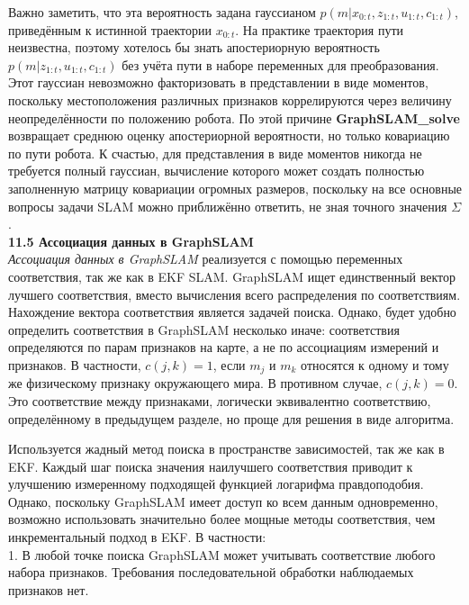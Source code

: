 \documentclass[10pt,a4paper]{article}
\begin{document}
Важно заметить, что эта вероятность задана гауссианом $p(m|x_{0:t},z_{1:t},u_{1:t},c_{1:t})$, приведённым к истинной траектории $x_{0:t}$. На практике траектория пути неизвестна, поэтому хотелось бы знать апостериорную вероятность  $p(m|z_{1:t},u_{1:t},c_{1:t})$ без учёта пути в наборе переменных для преобразования.  Этот гауссиан невозможно факторизовать в представлении в виде моментов, поскольку местоположения различных признаков коррелируются через величину неопределённости по положению робота. По этой причине \textbf{GraphSLAM\_solve} возвращает среднюю оценку апостериорной вероятности, но только ковариацию по пути робота. К счастью, для представления в виде моментов никогда не требуется полный гауссиан, вычисление которого может создать полностью заполненную матрицу ковариации огромных размеров, поскольку на все основные вопросы задачи SLAM можно приближённо ответить, не зная точного значения $\varSigma$.\\

\textbf{11.5	Ассоциация данных в GraphSLAM}\\

\textit{Ассоциация данных в GraphSLAM} реализуется с помощью переменных соответствия, так же как в EKF SLAM. GraphSLAM ищет единственный вектор лучшего соответствия, вместо вычисления всего распределения по соответствиям. Нахождение вектора соответствия является задачей поиска. Однако, будет удобно определить соответствия в GraphSLAM несколько иначе: соответствия определяются по парам признаков на карте, а не по ассоциациям измерений и признаков. В частности, $c(j,k)=1$, если $m_j$ и $m_k$ относятся к одному и тому же физическому признаку окружающего мира. В противном случае, $c(j,k)=0$. Это соответствие между признаками, логически эквивалентно соответствию, определённому в предыдущем разделе, но проще для решения в виде алгоритма. 

Используется жадный метод поиска в пространстве зависимостей, так же как в EKF. Каждый шаг поиска значения наилучшего соответствия приводит к улучшению измеренному подходящей функцией логарифма правдоподобия. Однако, поскольку GraphSLAM имеет доступ ко всем данным одновременно, возможно использовать значительно более мощные методы соответствия, чем инкрементальный подход в EKF. В частности:\\

1.	В любой точке поиска GraphSLAM может учитывать соответствие любого набора признаков. Требования последовательной обработки наблюдаемых признаков нет.\\
\end{document}
